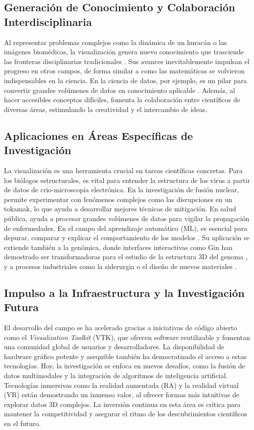 \documentclass[12pt,a4paper]{article}
\begin{document}
\subsection*{Generación de Conocimiento y Colaboración Interdisciplinaria}
Al representar problemas complejos como la dinámica de un huracán o las imágenes biomédicas, la visualización genera nuevo conocimiento que trasciende las fronteras disciplinarias tradicionales \cite{Moorhead2006}. Sus avances inevitablemente impulsan el progreso en otros campos, de forma similar a como las matemáticas se volvieron indispensables en la ciencia. En la ciencia de datos, por ejemplo, es un pilar para convertir grandes volúmenes de datos en conocimiento aplicable \cite{Andrienko2020}. Además, al hacer accesibles conceptos difíciles, fomenta la colaboración entre científicos de diversas áreas, estimulando la creatividad y el intercambio de ideas.

\subsection*{Aplicaciones en Áreas Específicas de Investigación}
La visualización es una herramienta crucial en tareas científicas concretas. Para los biólogos estructurales, es vital para entender la estructura de los virus a partir de datos de crio-microscopía electrónica. En la investigación de fusión nuclear, permite experimentar con fenómenos complejos como las disrupciones en un tokamak, lo que ayuda a desarrollar mejores técnicas de mitigación. En salud pública, ayuda a procesar grandes volúmenes de datos para vigilar la propagación de enfermedades. En el campo del aprendizaje automático (ML), es esencial para depurar, comparar y explicar el comportamiento de los modelos \cite{Andrienko2020}. Su aplicación se extiende también a la genómica, donde interfaces interactivas como Gin han demostrado ser transformadoras para el estudio de la estructura 3D del genoma \cite{nayak2019}, y a procesos industriales como la siderurgia o el diseño de nuevos materiales \cite{Moorhead2006}.

\subsection*{Impulso a la Infraestructura y la Investigación Futura}
El desarrollo del campo se ha acelerado gracias a iniciativas de código abierto como el \textit{Visualization Toolkit} (VTK), que ofrecen software reutilizable y fomentan una comunidad global de usuarios y desarrolladores. La disponibilidad de hardware gráfico potente y asequible también ha democratizado el acceso a estas tecnologías. Hoy, la investigación se enfoca en nuevos desafíos, como la fusión de datos multimodales y la integración de algoritmos de inteligencia artificial. Tecnologías inmersivas como la realidad aumentada (RA) y la realidad virtual (VR) están demostrando un inmenso valor, al ofrecer formas más intuitivas de explorar datos 3D complejos. La inversión continua en esta área es crítica para mantener la competitividad y asegurar el ritmo de los descubrimientos científicos en el futuro.
\end{document}
